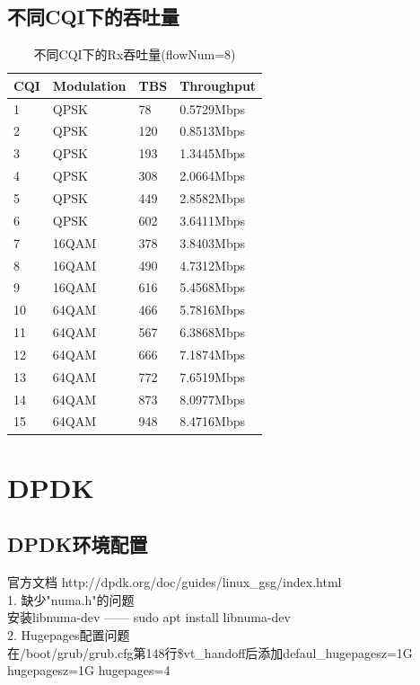 \documentclass{article}
\begin{document}
\subsection{不同CQI下的吞吐量}
\begin{table}[H]
\caption{不同CQI下的Rx吞吐量(flowNum=8)}
\centering
\begin{tabular}{|l|l|l|l|}%
	\hline  %
	CQI &	Modulation	&	TBS	&	Throughput	\\
	\hline
	1	&	QPSK		&	78	&	0.5729Mbps	\\
	\hline
	2	&	QPSK		&	120	&	0.8513Mbps	\\
	\hline
	3	&	QPSK		&	193	&	1.3445Mbps	\\
	\hline
	4	&	QPSK		&	308	&	2.0664Mbps	\\
	\hline
	5	&	QPSK		&	449	&	2.8582Mbps	\\
	\hline
	6	&	QPSK		&	602	&	3.6411Mbps	\\
	\hline
	7	&	16QAM		&	378	&	3.8403Mbps	\\
	\hline
	8	&	16QAM		&	490	&	4.7312Mbps	\\
	\hline
	9	&	16QAM		&	616	&	5.4568Mbps	\\
	\hline
	10	&	64QAM		&	466	&	5.7816Mbps	\\
	\hline
	11	&	64QAM		&	567	&	6.3868Mbps	\\
	\hline
	12	&	64QAM		&	666	&	7.1874Mbps	\\
	\hline
	13	&	64QAM		&	772	&	7.6519Mbps	\\
	\hline
	14	&	64QAM		&	873	&	8.0977Mbps	\\
	\hline
	15	&	64QAM		&	948	&	8.4716Mbps	\\
	\hline  %
\end{tabular}
\end{table}

\section{DPDK}
\subsection{DPDK环境配置}
官方文档 http://dpdk.org/doc/guides/linux\_gsg/index.html \\
1. 缺少"numa.h"的问题\\
安装libnuma-dev —— sudo apt install libnuma-dev\\
2. Hugepages配置问题\\
在/boot/grub/grub.cfg第148行\$vt\_handoff后添加defaul\_hugepagesz=1G hugepagesz=1G hugepages=4
\end{document}
